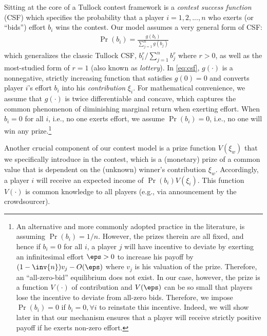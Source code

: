 \documentclass{sig-alternate-10pt}
\begin{document}
Sitting at the core of a Tullock contest framework is a {\em contest success function} (CSF) which specifies the probability that a player $i=1,2,...,n$ who exerts (or ``bids'') effort $b_i$ wins the contest. Our model assumes a very general form of CSF:
\begin{align}\label{eq:csf}
\Pr(b_i) = \frac{g(b_i)}{\sum_{j=1}^n g(b_j)}
\end{align}
which generalizes the classic Tullock CSF, $b_i^r/\sum_{j=1}^n b_j^r$ where $r>0$, as well as the most-studied form of $r=1$ (also known as {\em lottery}). In \eqref{eq:csf}, $g(\cdot)$ is a nonnegative, strictly increasing function that satisfies $g(0)=0$ and converts player $i$'s effort $b_i$ into his {\em contribution} $\xi_i$.  For mathematical convenience, we assume that $g(\cdot)$ is twice differentiable and concave, which captures the common phenomenon of diminishing marginal return when exerting effort.  When $b_i=0$ for all $i$, i.e., no one exerts effort, we assume $\Pr(b_i)=0$, i.e., no one will win any prize.\footnote{\label{foot:nonzero}An alternative and more commonly adopted practice in the literature, is assuming $\Pr(b_i)=1/n$. However, the prizes therein are all fixed, and hence if $b_i=0$ for all $i$, a player $j$ will have incentive to deviate by exerting an infinitesimal effort $\eps>0$ to increase his payoff by $(1-\inv{n})v_j - O(\eps)$ where $v_j$ is his valuation of the prize. Therefore, an ``all-zero-bid'' equilibrium does not exist. In our case, however, the prize is a function $V(\cdot)$ of contribution and $V(\eps)$ can be so small that players lose the incentive to deviate from all-zero bids. Therefore, we impose $\Pr(b_i)=0$ if $b_i=0, \forall i$ to reinstate this incentive. Indeed, we will show later in  that our mechanism ensures that a player will receive strictly positive payoff if he exerts non-zero effort.}

Another crucial component of our contest model is a prize function $V(\xi_w)$ that we specifically introduce in the contest, which is a (monetary) prize of a common value that is dependent on the (unknown) winner's contribution $\xi_w$. Accordingly, a player $i$ will receive an expected income of $\Pr(b_i) V(\xi_i)$. This function $V(\cdot)$ is common knowledge to all players (e.g., via announcement by the crowdsourcer). 
\end{document}
